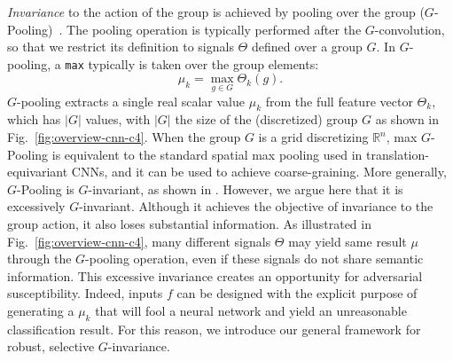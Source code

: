 \textit{Invariance} to the action of the group is achieved by pooling over the group ($G$-Pooling)~\cite{cohen2016group}.
The pooling operation is typically performed after the $G$-convolution, so that we restrict its definition to signals $\Theta$ defined over a group $G$. In $G$-pooling, a \texttt{max} typically is taken over the group elements:
\begin{equation}
    \mu_k = \max_{g \in G} \Theta_k(g) . %
\end{equation}
 $G$-pooling extracts a single real scalar value $\mu_k $ from the full feature vector $\Theta_k$, which has $|G|$ values, with $|G|$ the size of the (discretized) group $G$ as shown in Fig.~\ref{fig:overview-cnn-c4}. When the group $G$ is a grid discretizing $\mathbb{R}^n$, max $G$-Pooling is equivalent to the standard spatial max pooling used in translation-equivariant CNNs, and it can be used to achieve coarse-graining.
More generally, $G$-Pooling is $G$-invariant,
as shown in \cite{cohen2016group}. However, we argue here that it is excessively $G$-invariant. Although it achieves the objective of invariance to the group action, it also loses substantial information. As illustrated in Fig.~\ref{fig:overview-cnn-c4}, many different signals $\Theta$ may yield same result $\mu$ through the $G$-pooling operation, even if these signals do not share semantic information. This excessive invariance creates an opportunity for adversarial susceptibility. Indeed, inputs $f$ can be designed with the explicit purpose of generating a $\mu_k$ that will fool a neural network and yield an unreasonable classification result. For this reason, we introduce our general framework for robust, selective $G$-invariance.


